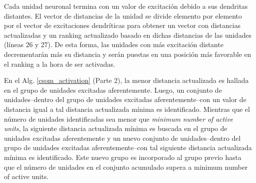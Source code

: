 Cada unidad neuronal termina con un valor de excitación debido a sus dendritas distantes. El vector de distancias de la unidad se divide elemento por elemento por el vector de excitaciones dendríticas para obtener un vector con distancias actualizadas y un ranking actualizado basado en dichas distancias de las unidades (líneas 26 y 27). De esta forma, las unidades con más excitación distante decrementarán más su distancia y serán puestas en una posición más favorable en el ranking a la hora de ser activadas.


En el Alg. \ref{csom_activation} (Parte 2), la menor distancia actualizada es hallada en el grupo de unidades excitadas aferentemente. Luego, un conjunto de unidades--dentro del grupo de unidades excitadas aferentemente--con un valor de distancia igual a tal distancia actualizada mínima es identificado. Mientras que el número de unidades identificadas sea menor que \emph{minimum number of active units}, la siguiente distancia actualizada mínima es buscada en el grupo de unidades excitadas aferentemente y un nuevo conjunto de unidades--dentro del grupo de unidades excitadas aferentemente--con tal siguiente distancia actualizada mínima es identificado. Este nuevo grupo es incorporado al grupo previo hasta que el número de unidades en el conjunto acumulado supera a minimum number of active units.


